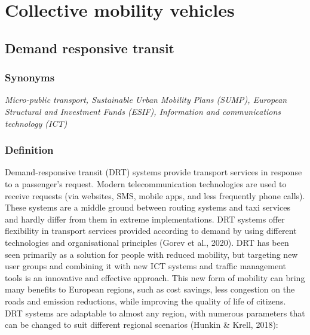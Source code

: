 \documentclass[
]{book}
\begin{document}
\hypertarget{collective}{%
\chapter{Collective mobility vehicles}\label{collective}}

\hypertarget{drt}{%
\section{Demand responsive transit}\label{drt}}

\hypertarget{synonyms-33}{%
\subsection*{Synonyms}\label{synonyms-33}}

\emph{Micro-public transport, Sustainable Urban Mobility Plans (SUMP), European Structural and Investment Funds (ESIF), Information and communications technology (ICT)}

\hypertarget{definition-36}{%
\subsection*{Definition}\label{definition-36}}

Demand-responsive transit (DRT) systems provide transport services in response to a passenger's request. Modern telecommunication technologies are used to receive requests (via websites, SMS, mobile apps, and less frequently phone calls). These systems are a middle ground between routing systems and taxi services and hardly differ from them in extreme implementations. DRT systems offer flexibility in transport services provided according to demand by using different technologies and organisational principles (Gorev et al., 2020).
DRT has been seen primarily as a solution for people with reduced mobility, but targeting new user groups and combining it with new ICT systems and traffic management tools is an innovative and effective approach. This new form of mobility can bring many benefits to European regions, such as cost savings, less congestion on the roads and emission reductions, while improving the quality of life of citizens. DRT systems are adaptable to almost any region, with numerous parameters that can be changed to suit different regional scenarios (Hunkin \& Krell, 2018):
\end{document}
